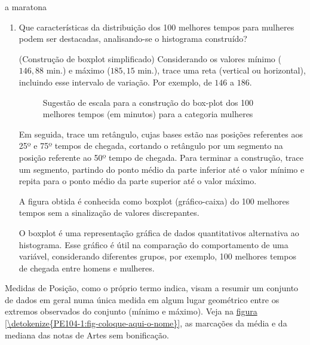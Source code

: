 \begin{task}{ a maratona}
\begin{enumerate}
\item Que características da distribuição dos 100 melhores tempos para mulheres podem ser destacadas, analisando-se o histograma construído?

(Construção de boxplot simplificado) Considerando os valores mínimo ($146{,}88$ min.) e máximo ($185{,}15$ min.), trace uma reta (vertical ou horizontal), incluindo esse intervalo de variação. Por exemplo, de $146$ a $186$.
\begin{figure}[H]
\centering


\caption{Sugestão de escala para a construção do box-plot dos 100 melhores tempos (em minutos) para a categoria mulheres}
\label{}
\end{figure}

Em seguida, trace um retângulo, cujas bases estão nas posições referentes aos 25º e 75º tempos de chegada, cortando o retângulo por um segmento na posição referente ao 50º tempo de chegada. Para terminar a construção, trace um segmento, partindo do ponto médio da parte inferior até o valor mínimo e repita para o ponto médio da parte superior até o valor máximo.

A figura obtida é conhecida como boxplot (gráfico-caixa) do 100 melhores tempos sem a sinalização de valores discrepantes.

O boxplot é uma representação gráfica de dados quantitativos alternativa ao histograma. Esse gráfico é útil na comparação do comportamento de uma variável, considerando diferentes grupos, por exemplo, 100 melhores tempos de chegada entre homens e mulheres.
\end{enumerate}
\end{task}


\label{\detokenize{PE104-1:sec-organizando1}}\label{\detokenize{PE104-1::doc}}\label{\detokenize{PE104-1:organizando-as-ideias-medidas-de-posicao}}

Medidas de Posição, como o próprio termo indica, visam a resumir um conjunto de dados em geral numa única medida em algum lugar geométrico entre os extremos observados do conjunto (mínimo e máximo). Veja na \hyperref[\detokenize{PE104-1:fig-coloque-aqui-o-nome}]{figura \ref{\detokenize{PE104-1:fig-coloque-aqui-o-nome}}}, as marcações da média e da mediana das notas de Artes sem bonificação.

